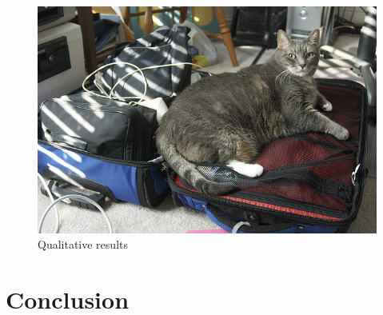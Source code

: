 \documentclass[a4paper, 11pt]{article} %
\begin{document}
\begin{figure}[H]
{\begin{minipage}[b]{0.4\textwidth}
			\includegraphics[width=1\textwidth]{./img/COCO_train2014_000000019131.jpg}
		\end{minipage}
	}
	\caption{Qualitative results}
	\label{fig:qua-res}
\end{figure}

\bigskip


\section{\textbf{Conclusion}}
\end{document}
